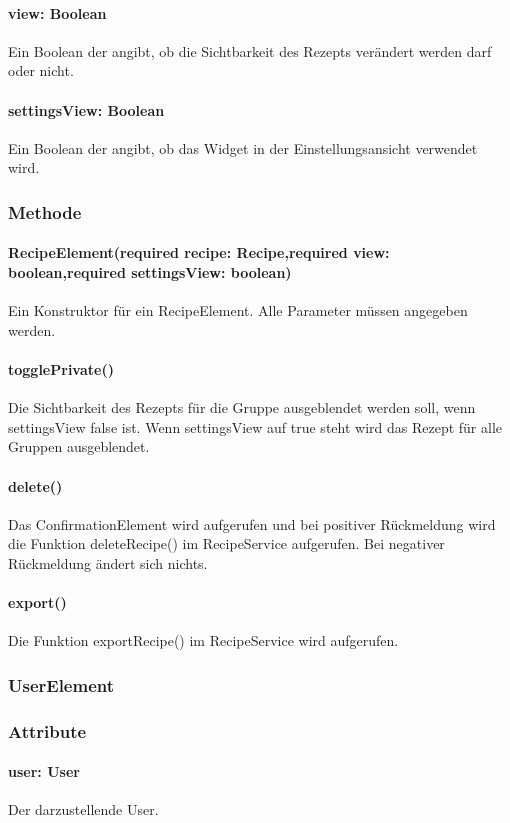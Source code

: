\documentclass{entwurfsheft}
\begin{document}
\paragraph*{view: Boolean} Ein Boolean der angibt, ob die Sichtbarkeit des Rezepts verändert werden darf oder nicht.
\paragraph*{settingsView: Boolean} Ein Boolean der angibt, ob das Widget in der Einstellungsansicht verwendet wird.

\subsubsection*{Methode}
\paragraph*{RecipeElement(required recipe: Recipe,required view: boolean,required settingsView: boolean)} Ein Konstruktor für ein RecipeElement. Alle Parameter müssen angegeben werden.
\paragraph*{togglePrivate()} Die Sichtbarkeit des Rezepts für die Gruppe ausgeblendet werden soll, wenn settingsView false ist. Wenn settingsView auf true steht wird das Rezept für alle Gruppen ausgeblendet.
\paragraph*{delete()} Das ConfirmationElement wird aufgerufen und bei positiver Rückmeldung wird die Funktion deleteRecipe() im RecipeService aufgerufen. Bei negativer Rückmeldung ändert sich nichts.
\paragraph*{export()} Die Funktion exportRecipe() im RecipeService wird aufgerufen.

\subsubsection{UserElement}\label{sec:UserElement}
\subsubsection*{Attribute}

\paragraph*{user: User} Der darzustellende User.
\end{document}
